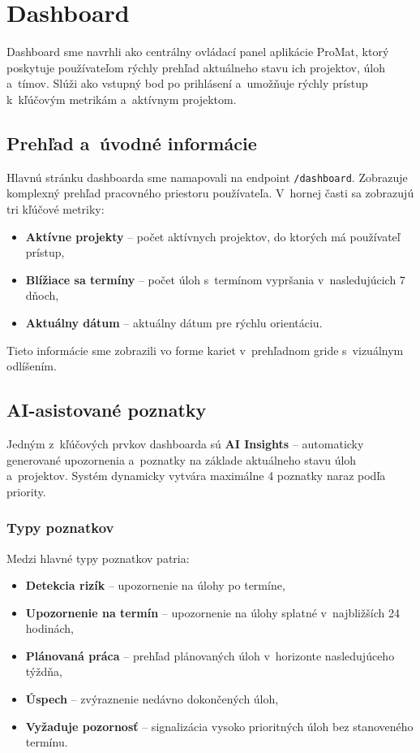 \chapter{Dashboard}

        Dashboard sme navrhli ako centrálny ovládací panel aplikácie ProMat, ktorý poskytuje
používateľom rýchly prehľad aktuálneho stavu ich projektov, úloh a~tímov. Slúži ako vstupný
bod po prihlásení a~umožňuje rýchly prístup k~kľúčovým metrikám a~aktívnym projektom.

\section{Prehľad a~úvodné informácie}

        Hlavnú stránku dashboarda sme namapovali na endpoint \texttt{/dashboard}. Zobrazuje
komplexný prehľad pracovného priestoru používateľa. V~hornej časti sa zobrazujú tri kľúčové metriky:

\begin{itemize}
  \item \textbf{Aktívne projekty} -- počet aktívnych projektov, do ktorých má používateľ prístup,
  \item \textbf{Blížiace sa termíny} -- počet úloh s~termínom vypršania v~nasledujúcich 7 dňoch,
  \item \textbf{Aktuálny dátum} -- aktuálny dátum pre rýchlu orientáciu.
\end{itemize}

        Tieto informácie sme zobrazili vo forme kariet v~prehľadnom gride s~vizuálnym odlíšením.

\section{AI-asistované poznatky}

        Jedným z~kľúčových prvkov dashboarda sú \textbf{AI Insights} -- automaticky generované
upozornenia a~poznatky na základe aktuálneho stavu úloh a~projektov. Systém dynamicky
vytvára maximálne 4 poznatky naraz podľa priority.

\subsection{Typy poznatkov}

        Medzi hlavné typy poznatkov patria:

\begin{itemize}
  \item \textbf{Detekcia rizík} -- upozornenie na úlohy po termíne,
  \item \textbf{Upozornenie na termín} -- upozornenie na úlohy splatné v~najbližších 24 hodinách,
  \item \textbf{Plánovaná práca} -- prehľad plánovaných úloh v~horizonte nasledujúceho týždňa,
  \item \textbf{Úspech} -- zvýraznenie nedávno dokončených úloh,
  \item \textbf{Vyžaduje pozornosť} -- signalizácia vysoko prioritných úloh bez stanoveného termínu.
\end{itemize}

